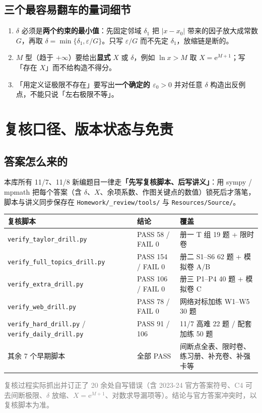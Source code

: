 \documentclass[11pt,a4paper]{ctexart}
\newcommand{\ee}{\mathrm{e}}
\newcommand{\eps}{\varepsilon}
\begin{document}
\subsection{三个最容易翻车的量词细节}
\begin{enumerate}
\item $\delta$ 必须是\textbf{两个约束的最小值}：先固定邻域 $\delta_1$ 把 $|x-x_0|$ 带来的因子放大成常数 $G$，再取 $\delta=\min\{\delta_1,\eps/G\}$。只写 $\eps/G$ 而不先定 $\delta_1$，放缩链是断的。
\item $M$ 型（趋于 $+\infty$）要给出\textbf{显式} $X$ 或 $\delta$，例如 $\ln x>M$ 取 $X=\ee^{M+1}$；写「存在 $X$」而不给构造不得分。
\item 「用定义证极限不存在」要写出\textbf{一个确定的 $\eps_0>0$} 并对任意 $\delta$ 构造出反例点，不能只说「左右极限不等」。
\end{enumerate}

\newpage
\section{复核口径、版本状态与免责}

\subsection{答案怎么来的}
本库所有 11/7、11/8 新编题目一律走\textbf{「先写复核脚本、后写讲义」}：用 sympy / mpmath 把每个答案（含 $\delta$、$X$、余项系数、作图关键点的数值）锁死后才落笔，脚本与讲义同步保存在 \texttt{Homework/\_review/tools/} 与 \texttt{Resources/Source/}。

\begin{longtable}{@{}p{6.6cm}p{2.3cm}p{6.1cm}@{}}
\toprule
\textbf{复核脚本} & \textbf{结论} & \textbf{覆盖} \\
\midrule
\texttt{verify\_taylor\_drill.py} & PASS 58 / FAIL 0 & 册一 T 组 19 题 + 限时卷 \\
\texttt{verify\_full\_topics\_drill.py} & PASS 154 / FAIL 0 & 册二 S1--S6 62 题 + 模拟卷 A/B \\
\texttt{verify\_extra\_drill.py} & PASS 106 / FAIL 0 & 册三 P1--P4 40 题 + 模拟卷 C \\
\texttt{verify\_web\_drill.py} & PASS 78 / FAIL 0 & 网络对标加练 W1--W5 30 题 \\
\texttt{verify\_hard\_drill.py} / \texttt{verify\_daily\_drill.py} & PASS 91 / 106 & 11/7 高难 22 题 / 配套加练 50 题 \\
其余 7 个早期脚本 & 全部 PASS & 间断点全表、限时卷、练习册、补充卷、补强卡等 \\
\bottomrule
\end{longtable}
\noindent\textcolor{gray}{\footnotesize 复核过程实际抓出并订正了 20 余处自写错误（含 2023-24 官方答案符号、C4 可去间断极限、$\delta$ 放缩、$X=\ee^{M+1}$、对数求导漏项等）。结论与官方答案冲突时，以复核脚本为准。}
\end{document}
